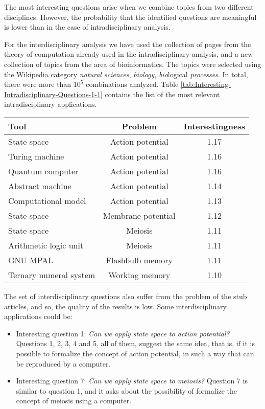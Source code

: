 The most interesting questions arise when we combine topics from two
different disciplines. However, the probability that the identified
questions are meaningful is lower than in the case of intradisciplinary
analysis.

For the interdisciplinary analysis we have used the collection of
pages from the theory of computation already used in the intradisciplinary
analysis, and a new collection of topics from the area of\emph{ }bioinformatics.
The topics were selected using the Wikipedia category \emph{natural
sciences}, \emph{biology}, \emph{bio}logical\emph{ processes}. In
total, there were more than $10^{5}$ combinations analyzed. Table
\ref{tab:Interesting-Intradisciplinary-Questions-1-1} contains the
list of the most relevant intradisciplinary applications.

\begin{table*}
\begin{centering}
\begin{tabular}{|l|c|c|}
\hline 
{Tool} & Problem & Interestingness\tabularnewline
\hline 
\hline 
State space & Action potential & 1.17\tabularnewline
\hline 
{Turing machine} & Action potential & 1.16\tabularnewline
\hline 
Quantum computer & Action potential & 1.16\tabularnewline
\hline 
Abstract machine & Action potential & 1.14\tabularnewline
\hline 
Computational model & Action potential & 1.13\tabularnewline
\hline 
State space & Membrane potential & 1.12\tabularnewline
\hline 
State space & Meiosis & 1.11\tabularnewline
\hline 
Arithmetic logic unit & Meiosis & 1.11\tabularnewline
\hline 
GNU MPAL & Flashbulb memory & 1.11\tabularnewline
\hline 
Ternary numeral system & Working memory & 1.10\tabularnewline
\hline 
\end{tabular}
\par\end{centering}

\caption{\label{tab:Interesting-Intradisciplinary-Questions-1-1}Interesting
Interdisciplinary Questions}
\end{table*}

The set of interdisciplinary questions also suffer from the problem
of the stub articles, and so, the quality of the results is low. Some
interdisciplinary applications could be:
\begin{itemize}
\item Interesting question 1: \emph{Can we apply state space to action potential?}
Questions 1, 2, 3, 4 and 5, all of them, suggest the same idea, that
is, if it is possible to formalize the concept of action potential,
in such a way that can be reproduced by a computer.
\item Interesting question 7: \emph{Can we apply state space to meiosis?}
Question 7 is similar to question 1, and it asks about the possibility
of formalize the concept of meiosis using a computer.
\end{itemize}

